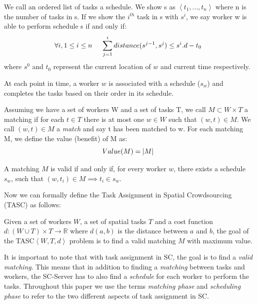 \vspace{-0.05in}
\begin{definition} [Schedule]
We call an ordered list of tasks a schedule. We show s as $\left\langle t_1, ..., t_n \right\rangle$ where n is the number of tasks in s. If we show the $i^{th}$ task in s with $s^i$, we say worker w is able to perform schedule s if and only if:
\vspace{-0.05in}
\begin{equation*}
\forall i, 1\leq i \leq n \ \ \ \ \sum_{j=1}^i distance(s^{j-1}, s^j) \leq s^i.d - t_0
\vspace{-0.1in}
\end{equation*}
where $s^0$ and $t_0$ represent the current location of $w$ and current time respectively.
\end{definition}
\vspace{-0.05in}
At each point in time, a worker $w$ is associated with a schedule ($s_w$) and completes the tasks based on their order in its schedule.
\vspace{-0.05in}
\begin{definition} [Matching]
Assuming we have a set of workers W and a set of tasks T, we call $M \subset W \times T$ a matching if for each $t \in T$ there is at most one $w \in W$ such that $\left( w, t \right) \in M$. We call $\left( w, t \right) \in M$ a \emph{match} and say t has been matched to w. For each matching M, we define the value (benefit) of M as:
\vspace{-0.05in}
\begin{equation*}
Value(M) = \vert M \vert
\vspace{-0.1in}
\end{equation*}
\end{definition}
\vspace{-0.05in}
\begin{definition} 
A matching $M$ is valid if and only if, for every worker $w$, there exists a schedule $s_w$, such that $(w, t_i) \in M \implies t_i \in s_w$. 
\end{definition}
\vspace{-0.05in}
Now we can formally define the Task Assignment in Spatial Crowdsourcing (TASC) as follows:
\vspace{-0.05in}
\begin{definition} 
Given a set of workers $W$, a set of spatial tasks $T$ and a cost function $d: \left( W \cup T \right) \times T \rightarrow \mathbb{R}$ where $d \left( a,b \right)$ is the distance between $a$ and $b$, the goal of the TASC$\left\langle W, T, d \right\rangle$ problem is to find a valid matching $M$ with maximum value.
\end{definition}
\vspace{-0.05in}
It is important to note that with task assignment in SC, the goal is to find a \textit{valid matching}. This means that in addition to finding a \textit{matching} between tasks and workers, the SC-Server has to also find a \textit{schedule} for each worker to perform the tasks. Throughout this paper we use the terms \textit{matching phase} and \textit{scheduling phase} to refer to the two different aspects of task assignment in SC.

